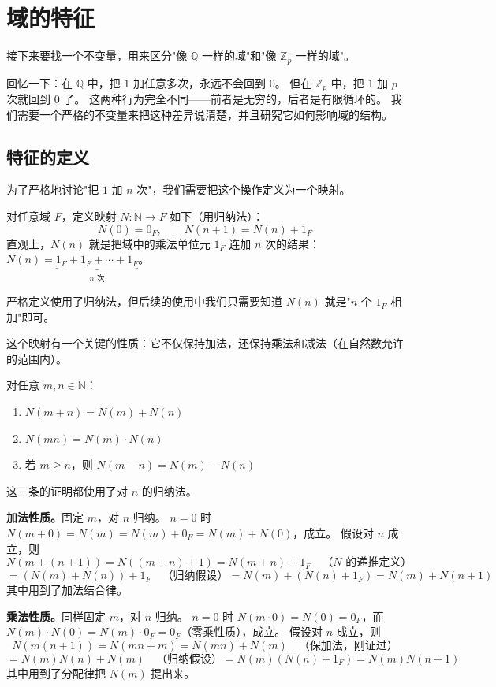 \section{域的特征}\label{sec:field-characteristic}

接下来要找一个不变量，用来区分"像 $\mathbb{Q}$ 一样的域"和"像 $\mathbb{Z}_p$ 一样的域"。

回忆一下：在 $\mathbb{Q}$ 中，把 $1$ 加任意多次，永远不会回到 $0$。
但在 $\mathbb{Z}_p$ 中，把 $1$ 加 $p$ 次就回到 $0$ 了。
这两种行为完全不同——前者是无穷的，后者是有限循环的。
我们需要一个严格的不变量来把这种差异说清楚，并且研究它如何影响域的结构。

\subsection{特征的定义}

为了严格地讨论"把 $1$ 加 $n$ 次"，我们需要把这个操作定义为一个映射。

对任意域 $F$，定义映射 $N: \mathbb{N} \to F$ 如下（用归纳法）：
\[
N(0) = 0_F, \qquad N(n+1) = N(n) + 1_F
\]
直观上，$N(n)$ 就是把域中的乘法单位元 $1_F$ 连加 $n$ 次的结果：$N(n) = \underbrace{1_F + 1_F + \cdots + 1_F}_{n \text{ 次}}$。

严格定义使用了归纳法，但后续的使用中我们只需要知道 $N(n)$ 就是"$n$ 个 $1_F$ 相加"即可。

这个映射有一个关键的性质：它不仅保持加法，还保持乘法和减法（在自然数允许的范围内）。

\begin{proposition}[$N$ 的保持性质]\label{prop:N-properties}
对任意 $m, n \in \mathbb{N}$：
\begin{enumerate}
    \item $N(m + n) = N(m) + N(n)$
    \item $N(mn) = N(m) \cdot N(n)$
    \item 若 $m \geq n$，则 $N(m - n) = N(m) - N(n)$
\end{enumerate}
\end{proposition}

这三条的证明都使用了对 $n$ 的归纳法。

\textbf{加法性质。}固定 $m$，对 $n$ 归纳。
$n = 0$ 时 $N(m + 0) = N(m) = N(m) + 0_F = N(m) + N(0)$，成立。
假设对 $n$ 成立，则
\[
N(m + (n+1)) = N((m+n)+1) = N(m+n) + 1_F \quad\text{（$N$ 的递推定义）}
\]
\[
= (N(m) + N(n)) + 1_F \quad\text{（归纳假设）}
= N(m) + (N(n) + 1_F) = N(m) + N(n+1)
\]
其中用到了加法结合律。

\textbf{乘法性质。}同样固定 $m$，对 $n$ 归纳。
$n = 0$ 时 $N(m \cdot 0) = N(0) = 0_F$，而 $N(m) \cdot N(0) = N(m) \cdot 0_F = 0_F$（零乘性质），成立。
假设对 $n$ 成立，则
\[
N(m(n+1)) = N(mn + m) = N(mn) + N(m) \quad\text{（保加法，刚证过）}
\]
\[
= N(m)N(n) + N(m) \quad\text{（归纳假设）}
= N(m)(N(n) + 1_F) = N(m)N(n+1)
\]
其中用到了分配律把 $N(m)$ 提出来。

